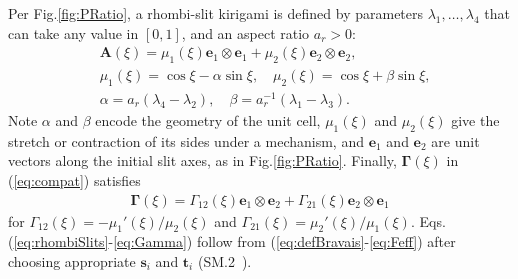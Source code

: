 \documentclass[aps,prl,twocolumn,superscriptaddress]{revtex4-1}
\begin{document}
 
 
Per Fig.\;\ref{fig:PRatio}, a rhombi-slit kirigami is defined by parameters  $\lambda_{1}, \ldots, \lambda_4$ that can take any value in $[0,1]$, and an aspect ratio $a_r >0$: 
\begin{equation}
\begin{aligned}\label{eq:rhombiSlits}
&\mathbf{A}(\xi) = \mu_1(\xi) \mathbf{e}_1 \otimes \mathbf{e}_1 + \mu_2(\xi) \mathbf{e}_2 \otimes \mathbf{e}_2, \\
&\mu_1(\xi) = \cos \xi - \alpha \sin \xi,\quad \mu_2(\xi)  = \cos \xi + \beta \sin \xi, \\
&\alpha = a_r (\lambda_4 - \lambda_2), \quad\beta =  a_r^{-1} (\lambda_1 - \lambda_3).
\end{aligned}
\end{equation}
Note $\alpha$ and $\beta$ encode the geometry of the unit cell, $\mu_{1}(\xi)$ and $\mu_2(\xi)$ give the stretch or contraction of its sides under a mechanism, and  $\mathbf{e}_{1}$ and $\mathbf{e}_2$ are unit vectors along the initial slit axes, as in Fig.\;\ref{fig:PRatio}. Finally,  $\boldsymbol{\Gamma}(\xi)$ in (\ref{eq:compat}) satisfies 
\begin{equation}
    \begin{aligned}\label{eq:Gamma}
    \boldsymbol{\Gamma}(\xi) = \Gamma_{12}(\xi) \mathbf{e}_1 \otimes \mathbf{e}_2 + \Gamma_{21}(\xi) \mathbf{e}_2 \otimes \mathbf{e}_1
    \end{aligned}
\end{equation} 
for $\Gamma_{12}(\xi)  = -\mu_1'(\xi)/\mu_{2}(\xi)$ and $\Gamma_{21}(\xi) = \mu_2'(\xi)/ \mu_1(\xi)$. 
Eqs.\;(\ref{eq:rhombiSlits}-\ref{eq:Gamma}) follow from (\ref{eq:defBravais}-\ref{eq:Feff}) after choosing appropriate $\mathbf{s}_i$ and $\mathbf{t}_i$ (SM.2~\cite{suppl}).
\end{document}
